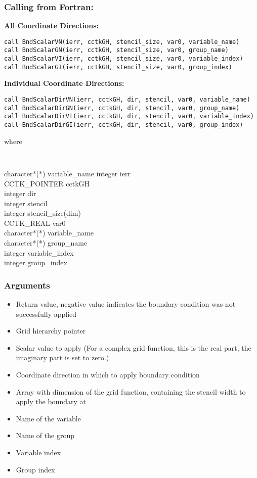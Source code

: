 \documentclass{article}
\begin{document}
\subsubsection*{Calling from Fortran:}
{\bf All Coordinate Directions:}
\begin{verbatim}
call BndScalarVN(ierr, cctkGH, stencil_size, var0, variable_name)
call BndScalarGN(ierr, cctkGH, stencil_size, var0, group_name)
call BndScalarVI(ierr, cctkGH, stencil_size, var0, variable_index)
call BndScalarGI(ierr, cctkGH, stencil_size, var0, group_index)
\end{verbatim}
{\bf Individual Coordinate Directions:}
\begin{verbatim}
call BndScalarDirVN(ierr, cctkGH, dir, stencil, var0, variable_name)
call BndScalarDirGN(ierr, cctkGH, dir, stencil, var0, group_name)
call BndScalarDirVI(ierr, cctkGH, dir, stencil, var0, variable_index)
call BndScalarDirGI(ierr, cctkGH, dir, stencil, var0, group_index)
\end{verbatim}
where
{\tt
\begin{tabbing}
character*(*) \= variable\_name\=\kill
integer \> ierr \\
CCTK\_POINTER \> cctkGH\\
integer \> dir\\
integer \> stencil\\
integer \> stencil\_size(dim)\\
CCTK\_REAL \> var0 \\
character*(*) \> variable\_name\\
character*(*) \> group\_name\\
integer \> variable\_index\\
integer \> group\_index\\
\end{tabbing}
}

\subsubsection*{Arguments}
\begin{itemize}
\item[{\tt ierr}] Return value, negative value indicates the
boundary condition was not successfully applied
\item[{\tt cctkGH}] Grid hierarchy pointer
\item[{\tt var0}] Scalar value to apply  (For a complex grid function, this is the real part, the imaginary part is set to zero.)
\item[{\tt dir}] Coordinate direction in which to apply boundary condition
\item[{\tt stencil\_size}] Array with dimension of the grid function, containing the stencil width to apply the boundary at
\item[{\tt variable\_name}] Name of the variable
\item[{\tt group\_name}] Name of the group
\item[{\tt variable\_index}] Variable index
\item[{\tt group\_index}] Group index
\end{itemize}
\end{document}
